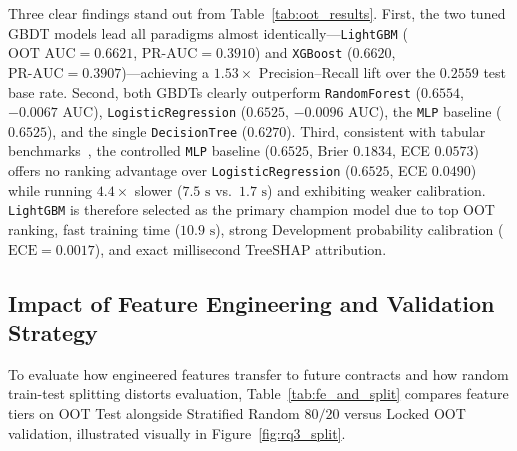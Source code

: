 Three clear findings stand out from Table~\ref{tab:oot_results}. First, the two tuned GBDT models lead all paradigms almost identically---\texttt{LightGBM} ($\text{OOT AUC} = 0.6621$, $\text{PR-AUC} = 0.3910$) and \texttt{XGBoost} ($0.6620$, $\text{PR-AUC} = 0.3907$)---achieving a $1.53\times$ Precision--Recall lift over the $0.2559$ test base rate. Second, both GBDTs clearly outperform \texttt{RandomForest} ($0.6554$, $-0.0067$ AUC), \texttt{LogisticRegression} ($0.6525$, $-0.0096$ AUC), the \texttt{MLP} baseline ($0.6525$), and the single \texttt{DecisionTree} ($0.6270$). Third, consistent with tabular benchmarks~\cite{gunnarsson2021,grinsztajn2022}, the controlled \texttt{MLP} baseline ($0.6525$, Brier $0.1834$, ECE $0.0573$) offers no ranking advantage over \texttt{LogisticRegression} ($0.6525$, ECE $0.0490$) while running $4.4\times$ slower ($7.5\text{ s}$ vs.\ $1.7\text{ s}$) and exhibiting weaker calibration. \texttt{LightGBM} is therefore selected as the primary champion model due to top OOT ranking, fast training time ($10.9\text{ s}$), strong Development probability calibration ($\text{ECE} = 0.0017$), and exact millisecond TreeSHAP attribution.

\subsection{Impact of Feature Engineering and Validation Strategy}
To evaluate how engineered features transfer to future contracts and how random train-test splitting distorts evaluation, Table~\ref{tab:fe_and_split} compares feature tiers on OOT Test alongside Stratified Random $80/20$ versus Locked OOT validation, illustrated visually in Figure~\ref{fig:rq3_split}.

